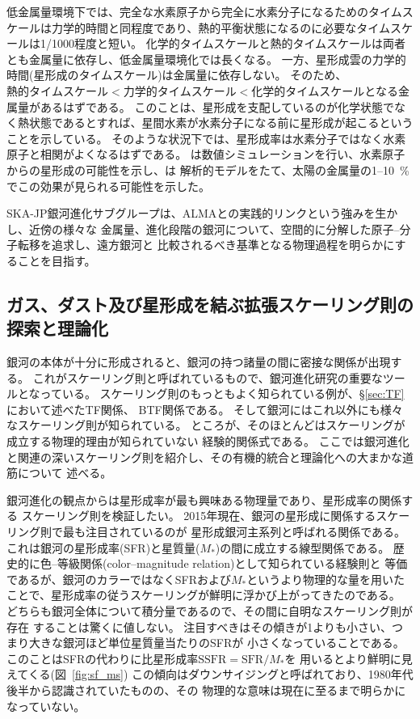 低金属量環境下では、完全な水素原子から完全に水素分子になるためのタイムスケールは力学的時間と同程度であり、熱的平衡状態になるのに必要なタイムスケールは1/1000程度と短い。
化学的タイムスケールと熱的タイムスケールは両者とも金属量に依存し、低金属量環境化では長くなる。
一方、星形成雲の力学的時間(星形成のタイムスケール)は金属量に依存しない。
そのため、$熱的タイムスケール < 力学的タイムスケール < 化学的タイムスケール$となる金属量があるはずである。
このことは、星形成を支配しているのが化学状態でなく熱状態であるとすれば、星間水素が水素分子になる前に星形成が起こるということを示している。
そのような状況下では、星形成率は水素分子ではなく水素原子と相関がよくなるはずである。
\citet{glover2012}は数値シミュレーションを行い、水素原子からの星形成の可能性を示し、\citet{krumholtz2012}は
解析的モデルをたて、太陽の金属量の1--10~\%でこの効果が見られる可能性を示した。

SKA-JP銀河進化サブグループは、ALMAとの実践的リンクという強みを生かし、近傍の様々な
金属量、進化段階の銀河について、空間的に分解した原子--分子転移を追求し、遠方銀河と
比較されるべき基準となる物理過程を明らかにすることを目指す。

\subsection{ガス、ダスト及び星形成を結ぶ拡張スケーリング則の探索と理論化}

銀河の本体が十分に形成されると、銀河の持つ諸量の間に密接な関係が出現する。
これがスケーリング則と呼ばれているもので、銀河進化研究の重要なツールとなっている。
スケーリング則のもっともよく知られている例が、\S\ref{sec:TF}において述べたTF関係、
BTF関係である。
そして銀河にはこれ以外にも様々なスケーリング則が知られている。
ところが、そのほとんどはスケーリングが成立する物理的理由が知られていない
経験的関係式である。
ここでは銀河進化と関連の深いスケーリング則を紹介し、その有機的統合と理論化への大まかな道筋について
述べる。

銀河進化の観点からは星形成率が最も興味ある物理量であり、星形成率の関係する
スケーリング則を検証したい。
2015年現在、銀河の星形成に関係するスケーリング則で最も注目されているのが
星形成銀河主系列と呼ばれる関係である。
これは銀河の星形成率(SFR)と星質量($M_*$)の間に成立する線型関係である。
歴史的に色--等級関係(color--magnitude relation)として知られている経験則と
等価であるが、銀河のカラーではなくSFRおよび$M_*$というより物理的な量を用いた
ことで、星形成率の従うスケーリングが鮮明に浮かび上がってきたのである\citep[e.g.,][]{schiminovich2007}。
どちらも銀河全体について積分量であるので、その間に自明なスケーリング則が存在
することは驚くに値しない。
注目すべきはその傾きが1よりも小さい、つまり大きな銀河ほど単位星質量当たりのSFRが
小さくなっていることである。
このことはSFRの代わりに比星形成率$\mbox{SSFR} = \mbox{SFR} / M_*$を
用いるとより鮮明に見えてくる(図~\ref{fig:sf_ms})
この傾向はダウンサイジングと呼ばれており、1980年代後半から認識されていたものの、その
物理的な意味は現在に至るまで明らかになっていない。

